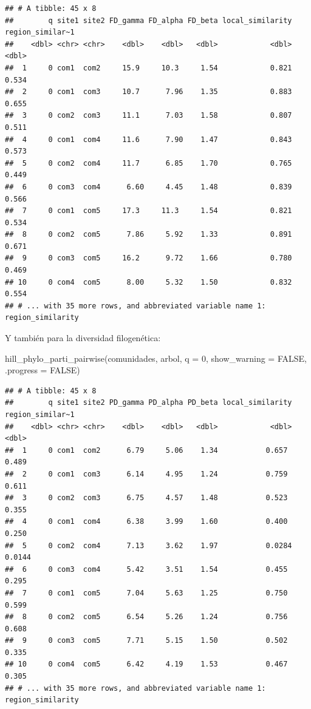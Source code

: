 \documentclass[
]{article}
\newenvironment{Shaded}{\begin{snugshade}}{\end{snugshade}}
\newcommand{\AttributeTok}[1]{\textcolor[rgb]{0.77,0.63,0.00}{#1}}
\newcommand{\ConstantTok}[1]{\textcolor[rgb]{0.00,0.00,0.00}{#1}}
\newcommand{\DecValTok}[1]{\textcolor[rgb]{0.00,0.00,0.81}{#1}}
\newcommand{\FunctionTok}[1]{\textcolor[rgb]{0.00,0.00,0.00}{#1}}
\newcommand{\NormalTok}[1]{#1}
\begin{document}
\begin{verbatim}
## # A tibble: 45 x 8
##        q site1 site2 FD_gamma FD_alpha FD_beta local_similarity region_similar~1
##    <dbl> <chr> <chr>    <dbl>    <dbl>   <dbl>            <dbl>            <dbl>
##  1     0 com1  com2     15.9     10.3     1.54            0.821            0.534
##  2     0 com1  com3     10.7      7.96    1.35            0.883            0.655
##  3     0 com2  com3     11.1      7.03    1.58            0.807            0.511
##  4     0 com1  com4     11.6      7.90    1.47            0.843            0.573
##  5     0 com2  com4     11.7      6.85    1.70            0.765            0.449
##  6     0 com3  com4      6.60     4.45    1.48            0.839            0.566
##  7     0 com1  com5     17.3     11.3     1.54            0.821            0.534
##  8     0 com2  com5      7.86     5.92    1.33            0.891            0.671
##  9     0 com3  com5     16.2      9.72    1.66            0.780            0.469
## 10     0 com4  com5      8.00     5.32    1.50            0.832            0.554
## # ... with 35 more rows, and abbreviated variable name 1: region_similarity
\end{verbatim}

\hfill\break
Y también para la diversidad filogenética:

\begin{Shaded}
\begin{Highlighting}[]
\FunctionTok{hill\_phylo\_parti\_pairwise}\NormalTok{(comunidades, arbol, }\AttributeTok{q =} \DecValTok{0}\NormalTok{, }\AttributeTok{show\_warning =} \ConstantTok{FALSE}\NormalTok{, }\AttributeTok{.progress =} \ConstantTok{FALSE}\NormalTok{) }
\end{Highlighting}
\end{Shaded}

\begin{verbatim}
## # A tibble: 45 x 8
##        q site1 site2 PD_gamma PD_alpha PD_beta local_similarity region_similar~1
##    <dbl> <chr> <chr>    <dbl>    <dbl>   <dbl>            <dbl>            <dbl>
##  1     0 com1  com2      6.79     5.06    1.34           0.657            0.489 
##  2     0 com1  com3      6.14     4.95    1.24           0.759            0.611 
##  3     0 com2  com3      6.75     4.57    1.48           0.523            0.355 
##  4     0 com1  com4      6.38     3.99    1.60           0.400            0.250 
##  5     0 com2  com4      7.13     3.62    1.97           0.0284           0.0144
##  6     0 com3  com4      5.42     3.51    1.54           0.455            0.295 
##  7     0 com1  com5      7.04     5.63    1.25           0.750            0.599 
##  8     0 com2  com5      6.54     5.26    1.24           0.756            0.608 
##  9     0 com3  com5      7.71     5.15    1.50           0.502            0.335 
## 10     0 com4  com5      6.42     4.19    1.53           0.467            0.305 
## # ... with 35 more rows, and abbreviated variable name 1: region_similarity
\end{verbatim}
\end{document}
